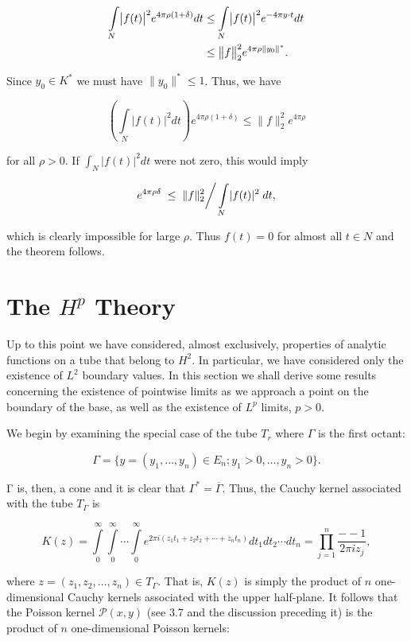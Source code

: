 \[
\begin{aligned}{\intop_{N}\bigl|f(t)\bigr|^{2}e^{4\pi\rho(1+\delta)}d t}&{{}\leq\intop_{N}\bigl|f(t)\bigr|^{2}e^{-4\pi y\cdot t}d t}\\ {}&{{}\leq\bigl\|f\bigr\|_{2}^{2}e^{4\pi\rho\|y_{0}\|^{*}}.}\\ \end{aligned}
\]

Since $y_0 \in K^*$ we must have $\|y_0\|^* \leq 1$. Thus, we have

\[
\left(\int\limits_{N}\left|f(t)\right|^{2}dt\right)e^{4\pi\rho(1+\delta)}\leq\|f\|_{2}^{2}e^{4\pi\rho}
\]

for all $\rho > 0$. If $\int_{N} |f(t)|^{2} dt$ were not zero, this would imply

\[
e^{4\pi\rho\delta}\;\leq\;\|f\|_{2}^{2}\bigg/\intop_{N}\lvert f(t)\rvert^{2}\;{d}t,
\]

which is clearly impossible for large $\rho$. Thus $f(t) = 0$ for almost all $t \in N$ and the theorem follows.

\section{The  $H^{p}$ Theory}

Up to this point we have considered, almost exclusively, properties of analytic functions on a tube that belong to $H^2$. In particular, we have considered only the existence of $L^2$ boundary values. In this section we shall derive some results concerning the existence of pointwise limits as we approach a point on the boundary of the base, as well as the existence of $L^p$ limits, $p > 0$.

We begin by examining the special case of the tube $T_{r}$ where $\Gamma$ is the first octant:

\[
\Gamma=\{y=(y_{1},\ldots,y_{n})\in E_{n};y_{1}>0,\ldots,y_{n}>0\}.
\]

Γ is, then, a cone and it is clear that $\Gamma^* = \overline{\Gamma}$. Thus, the Cauchy kernel associated with the tube $T_{\Gamma}$ is

\[
K(z)=\int\limits_{0}^{\infty}\int\limits_{0}^{\infty}\cdots\int\limits_{0}^{\infty}e^{2\pi i(z_{1}t_{1}+z_{2}t_{2}+\cdots+z_{n}t_{n})}d t_{1}d t_{2}\cdots d t_{n}=\prod_{j=1}^{n}\frac{--1}{2\pi i z_{j}},
\]

where $z = (z_1, z_2, \ldots, z_n) \in T_\Gamma$. That is, $K(z)$ is simply the product of $n$ one-dimensional Cauchy kernels associated with the upper half-plane. It follows that the Poisson kernel $\mathcal{P}(x, y)$ (see 3.7 and the discussion preceding it) is the product of $n$ one-dimensional Poisson kernels:

